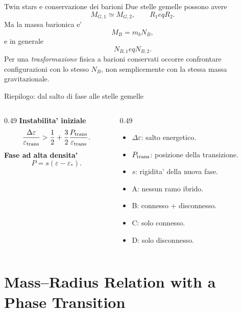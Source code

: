 \begin{frame}{Twin stars e conservazione dei barioni}
\small
Due stelle gemelle possono avere
\[
M_{G,1}\simeq M_{G,2},\qquad R_1
eq R_2.
\]
Ma la massa barionica e'
\[
M_B=m_bN_B,
\]
e in generale
\[
N_{B,1}
eq N_{B,2}.
\]
Per una \emph{trasformazione} fisica a barioni conservati occorre
confrontare configurazioni con lo stesso $N_B$, non semplicemente
con la stessa massa gravitazionale.
\end{frame}

\begin{frame}{Riepilogo: dal salto di fase alle stelle gemelle}
\small
\begin{columns}[T,onlytextwidth]
\begin{column}{0.49\textwidth}
\textbf{Instabilita' iniziale}
\[
\frac{\Delta\varepsilon}{\varepsilon_{\rm trans}}>
\frac12+\frac32\frac{P_{\rm trans}}
{\varepsilon_{\rm trans}}.
\]
\textbf{Fase ad alta densita'}
\[
P=s(\varepsilon-\varepsilon_*).
\]
\end{column}
\begin{column}{0.49\textwidth}
\begin{itemize}
\item $\Delta\varepsilon$: salto energetico.
\item $P_{\rm trans}$: posizione della transizione.
\item $s$: rigidita' della nuova fase.
\item A: nessun ramo ibrido.
\item B: connesso + disconnesso.
\item C: solo connesso.
\item D: solo disconnesso.
\end{itemize}
\end{column}
\end{columns}
\end{frame}

\section{Mass--Radius Relation with a Phase Transition}

